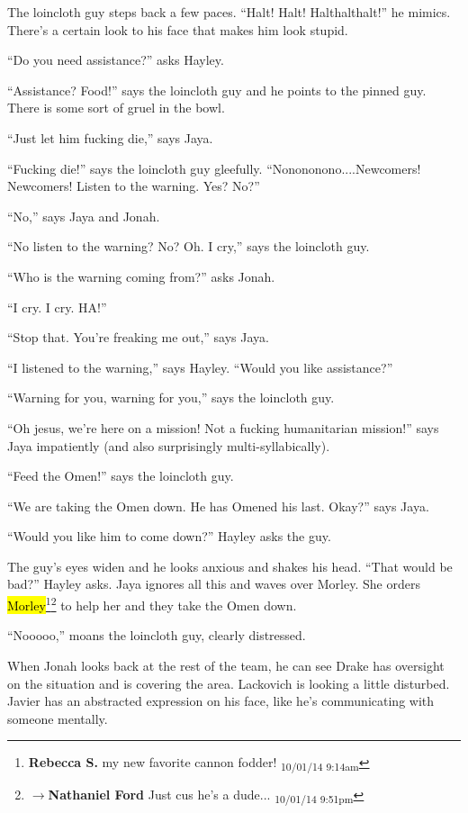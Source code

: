 The loincloth guy steps back a few paces.  ``Halt!  Halt!  Halthalthalt!'' he mimics.  There's a certain look to his face that makes him look stupid.

``Do you need assistance?'' asks Hayley.

``Assistance?  Food!'' says the loincloth guy and he points to the pinned guy.  There is some sort of gruel in the bowl.

``Just let him fucking die,'' says Jaya.

``Fucking die!'' says the loincloth guy gleefully.  ``Nonononono....Newcomers!  Newcomers!  Listen to the warning.  Yes?  No?''

``No,'' says Jaya and Jonah.

``No listen to the warning?  No?  Oh.  I cry,'' says the loincloth guy.

``Who is the warning coming from?'' asks Jonah.

``I cry.  I cry.  HA!''

``Stop that.  You're freaking me out,'' says Jaya.

``I listened to the warning,'' says Hayley. ``Would you like assistance?''

``Warning for you, warning for you,'' says the loincloth guy.

``Oh jesus, we're here on a mission!  Not a fucking humanitarian mission!'' says Jaya impatiently (and also surprisingly multi-syllabically).

``Feed the Omen!'' says the loincloth guy.

``We are taking the Omen down.  He has Omened his last. Okay?'' says Jaya.

``Would you like him to come down?'' Hayley asks the guy.

The guy's eyes widen and he looks anxious and shakes his head.  ``That would be bad?'' Hayley asks.  Jaya ignores all this and waves over Morley.  She orders \hl{Morley}\footnote{\textbf{Rebecca S. }my new favorite cannon fodder! \textsubscript{10/01/14 9:14am}}\footnote{$\rightarrow$\textbf{Nathaniel Ford }Just cus he's a dude... \textsubscript{10/01/14 9:51pm}} to help her and they take the Omen down.

``Nooooo,'' moans the loincloth guy, clearly distressed.

When Jonah looks back at the rest of the team, he can see Drake has oversight on the situation and is covering the area.  Lackovich is looking a little disturbed.  Javier has an abstracted expression on his face, like he's communicating with someone mentally.

